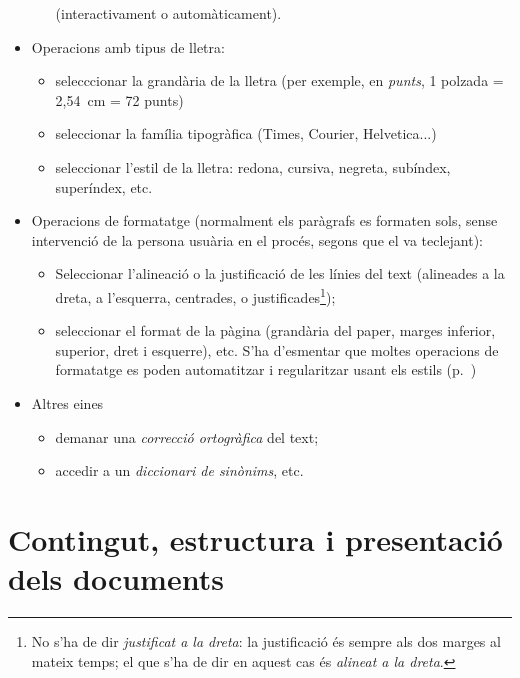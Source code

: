 \begin{itemize}
\begin{itemize}
           (interactivament o automàticament).
     \end{itemize}
\item Operacions amb tipus de lletra:
     \begin{itemize}
     \item selecccionar la grandària de la lletra (per exemple, en
       \emph{punts}, 1 polzada = 2,54~cm = 72 punts)
     \item seleccionar la família tipogràfica (Times, Courier,
           Helvetica...)
         \item seleccionar l'estil de la lletra: redona, cursiva,
           negreta, subíndex, superíndex, etc.
     \end{itemize}
   \item Operacions de formatatge (normalment els paràgrafs es
     formaten sols, sense intervenció de la persona usuària en el
     procés, segons que el va teclejant):
     \begin{itemize}
     \item Seleccionar l'alineació o la justificació de
           les línies del text
           (alineades a la dreta, a l'esquerra, centrades, o
           justificades\footnote{No s'ha de dir \emph{justificat a la
               dreta}: la justificació és sempre als dos marges
             al mateix temps; el que s'ha de dir en aquest cas és \emph{alineat
               a la dreta}.});
     \item seleccionar el format de la pàgina (grandària del
       paper, marges inferior,
       superior, dret i esquerre), etc.
     S'ha d'esmentar que moltes operacions de formatatge es poden
     automatitzar i regularitzar usant els estils (p.~\pageref{pg:estil})
     \end{itemize}
\item Altres eines
     \begin{itemize}
     \item  demanar una \emph{correcció ortogràfica} del text;
     \item accedir a un \emph{diccionari de sinònims}, etc.
     \end{itemize}
\end{itemize}

\section[Contingut, estructura i presentació]{Contingut, estructura i presentació dels documents}
\label{ss:separac}

